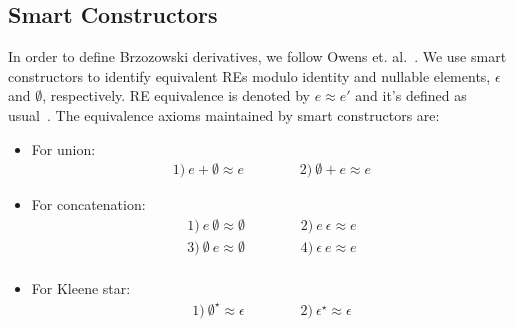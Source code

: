 \documentclass[review]{elsarticle}
\theoremstyle{definition}
\begin{document}
\subsection{Smart Constructors}\label{sec:smart}

In order to define Brzozowski derivatives, we follow Owens et. al.~\cite{Owens2009}. We use
smart constructors to identify equivalent REs modulo identity and nullable
elements, $\epsilon$ and $\emptyset$, respectively. RE equivalence is
denoted by $e \approx e'$ and it's defined as usual~\cite{Hopcroft2000}.
The equivalence axioms maintained by smart constructors are:
\begin{itemize}
    \item For union:
      \[
          \begin{array}{ccc}
              1)\: e + \emptyset \approx e &\hspace{1cm} & 2)\: \emptyset + e \approx e
          \end{array}
      \]
      \item For concatenation:
      \[
          \begin{array}{ccc}
              1)\: e\:\emptyset \approx \emptyset & \hspace{1cm} & 2)\: e\:\epsilon \approx e\\
              3)\: \emptyset\:e\approx \emptyset & & 4)\: \epsilon\: e \approx e\\
          \end{array}
      \]
      \item For Kleene star:
      \[
           \begin{array}{ccc}
               1)\: \emptyset^\star \approx \epsilon & \hspace{1cm} & 2)\: \epsilon^\star
                                                  \approx \epsilon
           \end{array}
      \]
\end{itemize}
\end{document}
